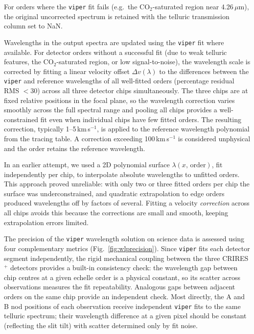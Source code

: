 \documentclass{aa}
\newcommand{\crires}{CRIRES$^+$}
\newcommand{\um}{$\mu$m}
\newcommand{\kms}{km\,s$^{-1}$}
\newcommand{\viper}{\texttt{viper}}
\begin{document}
For orders where the \viper{} fit fails (e.g.\ the CO$_2$-saturated
region near 4.26\,\um), the original uncorrected spectrum is retained
with the telluric transmission column set to NaN.

Wavelengths in the output spectra are updated using the \viper{} fit
where available. For detector orders without a successful fit (due to weak
telluric features, the CO$_2$-saturated region, or low signal-to-noise),
the wavelength scale is corrected by fitting a linear velocity offset
$\Delta v(\lambda)$ to the differences between the \viper{} and
reference wavelengths of all well-fitted orders (percentage residual RMS
$< 30$) across all three detector chips simultaneously. The three chips
are at fixed relative positions in the focal plane, so the wavelength
correction varies smoothly across the full spectral range and pooling all
chips provides a well-constrained fit even when individual chips have few
fitted orders. The resulting correction, typically 1--5\,\kms{}, is
applied to the reference wavelength polynomial from the tracing table.
A correction exceeding 100\,\kms{} is considered unphysical and the
order retains the reference wavelength.

In an earlier attempt, we used a 2D polynomial surface $\lambda(x,\,
\mathrm{order})$, fit independently per chip, to interpolate absolute
wavelengths to unfitted orders. This approach proved unreliable:
with only two or three fitted orders per chip the surface was
underconstrained, and quadratic extrapolation to edge orders produced
wavelengths off by factors of several. Fitting a velocity \emph{correction}
across all chips avoids this because the corrections are small and smooth,
keeping extrapolation errors limited.

The precision of the \viper{} wavelength solution on science data is
assessed using four complementary metrics (Fig.~\ref{fig:wlprecision}).
Since \viper{} fits each detector segment independently, the rigid
mechanical coupling between the three \crires{} detectors provides a
built-in consistency check: the wavelength gap between chip centres at a
given echelle order is a physical constant, so its scatter across
observations measures the fit repeatability. Analogous gaps between
adjacent orders on the same chip provide an independent check. Most
directly, the A and B nod positions of each observation receive
independent \viper{} fits to the same telluric spectrum; their
wavelength difference at a given pixel should be constant (reflecting the
slit tilt) with scatter determined only by fit noise.
\end{document}
